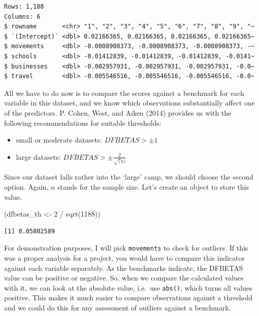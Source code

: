 \documentclass[
  letterpaper,
]{krantz}
\makeatletter
\newenvironment{Shaded}{\begin{snugshade}}{\end{snugshade}}
\newcommand{\DecValTok}[1]{\textcolor[rgb]{0.68,0.00,0.00}{#1}}
\newcommand{\FunctionTok}[1]{\textcolor[rgb]{0.28,0.35,0.67}{#1}}
\newcommand{\NormalTok}[1]{\textcolor[rgb]{0.00,0.23,0.31}{#1}}
\newcommand{\OtherTok}[1]{\textcolor[rgb]{0.00,0.23,0.31}{#1}}
\newcommand{\SpecialCharTok}[1]{\textcolor[rgb]{0.37,0.37,0.37}{#1}}
\newenvironment{kframe}{%
\medskip{}
\setlength{\fboxsep}{.8em}
 \def\at@end@of@kframe{}%
 \ifinner\ifhmode%
  \def\at@end@of@kframe{\end{minipage}}%
  \begin{minipage}{\columnwidth}%
 \fi\fi%
 \def\FrameCommand##1{\hskip\@totalleftmargin \hskip-\fboxsep
 \colorbox{shadecolor}{##1}\hskip-\fboxsep
     \hskip-\linewidth \hskip-\@totalleftmargin \hskip\columnwidth}%
 \MakeFramed {\advance\hsize-\width
   \@totalleftmargin\z@ \linewidth\hsize
   \@setminipage}}%
 {\par\unskip\endMakeFramed%
 \at@end@of@kframe}
\renewenvironment{Shaded}{\begin{kframe}}{\end{kframe}}
\makeatother
\begin{document}
\begin{verbatim}
Rows: 1,188
Columns: 6
$ rowname       <chr> "1", "2", "3", "4", "5", "6", "7", "8", "9", "~
$ `(Intercept)` <dbl> 0.02166365, 0.02166365, 0.02166365, 0.02166365~
$ movements     <dbl> -0.0008908373, -0.0008908373, -0.0008908373, -~
$ schools       <dbl> -0.01412839, -0.01412839, -0.01412839, -0.0141~
$ businesses    <dbl> -0.002957931, -0.002957931, -0.002957931, -0.0~
$ travel        <dbl> -0.005546516, -0.005546516, -0.005546516, -0.0~
\end{verbatim}

All we have to do now is to compare the scores against a benchmark for
each variable in this dataset, and we know which observations
substantially affect one of the predictors. P. Cohen, West, and Aiken
(2014) provides us with the following recommendations for suitable
thresholds:

\begin{itemize}
\item
  small or moderate datasets: \(DFBETAS > \pm 1\)
\item
  large datasets: \(DFBETAS > \pm\frac{2}{\sqrt(n)}\)
\end{itemize}

Since our dataset falls rather into the `large' camp, we should choose
the second option. Again, \(n\) stands for the sample size. Let's create
an object to store this value.

\begin{Shaded}
\begin{Highlighting}[]
\NormalTok{(dfbetas\_th }\OtherTok{\textless{}{-}} \DecValTok{2} \SpecialCharTok{/} \FunctionTok{sqrt}\NormalTok{(}\DecValTok{1188}\NormalTok{))}
\end{Highlighting}
\end{Shaded}

\begin{verbatim}
[1] 0.05802589
\end{verbatim}

For demonstration purposes, I will pick \texttt{movements} to check for
outliers. If this was a proper analysis for a project, you would have to
compare this indicator against each variable separately. As the
benchmarks indicate, the DFBETAS value can be positive or negative. So,
when we compare the calculated values with it, we can look at the
absolute value, i.e.~use \texttt{abs()}, which turns all values
positive. This makes it much easier to compare observations against a
threshold and we could do this for any assessment of outliers against a
benchmark.
\end{document}
